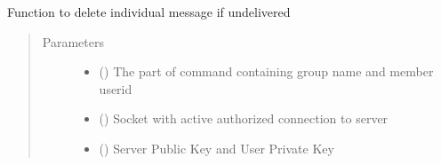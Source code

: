 \documentclass[letterpaper,10pt,english]{sphinxmanual}
\begin{document}
\begin{fulllineitems}
\label{\detokenize{userInputHandler:userInputHandler.deleteGroupMessageIfUndelivered}}
Function to delete individual message if undelivered
\begin{quote}\begin{description}
\item[{Parameters}] \leavevmode\begin{itemize}
\item {} 
 () \textendash{} The part of command containing group name and member userid

\item {} 
 () \textendash{} Socket with active authorized connection to server

\item {} 
 () \textendash{} Server Public Key and User Private Key

\end{itemize}

\end{description}\end{quote}

\end{fulllineitems}

\end{document}
